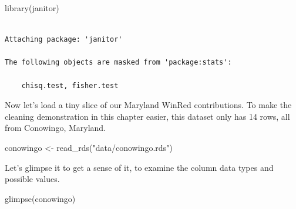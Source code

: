 \documentclass[
  letterpaper,
  DIV=11,
  numbers=noendperiod]{scrreprt}
\newenvironment{Shaded}{\begin{snugshade}}{\end{snugshade}}
\newcommand{\FunctionTok}[1]{\textcolor[rgb]{0.28,0.35,0.67}{#1}}
\newcommand{\NormalTok}[1]{\textcolor[rgb]{0.00,0.23,0.31}{#1}}
\newcommand{\OtherTok}[1]{\textcolor[rgb]{0.00,0.23,0.31}{#1}}
\newcommand{\StringTok}[1]{\textcolor[rgb]{0.13,0.47,0.30}{#1}}
\begin{document}
\begin{Shaded}
\begin{Highlighting}[]
\FunctionTok{library}\NormalTok{(janitor)}
\end{Highlighting}
\end{Shaded}

\begin{verbatim}

Attaching package: 'janitor'

The following objects are masked from 'package:stats':

    chisq.test, fisher.test
\end{verbatim}

Now let's load a tiny slice of our Maryland WinRed contributions. To
make the cleaning demonstration in this chapter easier, this dataset
only has 14 rows, all from Conowingo, Maryland.

\begin{Shaded}
\begin{Highlighting}[]
\NormalTok{conowingo }\OtherTok{\textless{}{-}} \FunctionTok{read\_rds}\NormalTok{(}\StringTok{"data/conowingo.rds"}\NormalTok{)}
\end{Highlighting}
\end{Shaded}

Let's glimpse it to get a sense of it, to examine the column data types
and possible values.

\begin{Shaded}
\begin{Highlighting}[]
\FunctionTok{glimpse}\NormalTok{(conowingo)}
\end{Highlighting}
\end{Shaded}
\end{document}
